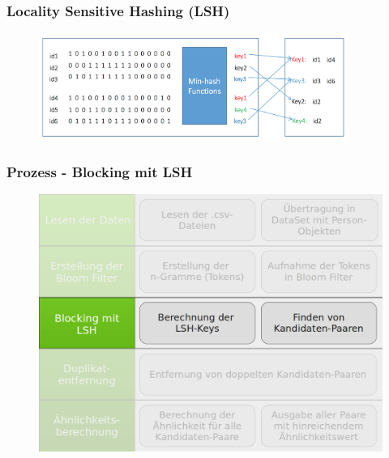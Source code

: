\documentclass{beamer}
\begin{document}
    \begin{frame}
        \frametitle{Locality Sensitive Hashing (LSH)}

            \begin{figure}[H]
                \includegraphics[width=0.9\textwidth]{graphics/lsh_intro.png}
            \end{figure}


    \end{frame}

    \begin{frame}
    		\frametitle{Prozess - Blocking mit LSH}
    		\begin{figure}[H]
    			\includegraphics[width=\textwidth]{graphics/process_3.png}
    		\end{figure}
    \end{frame}
    
\end{document}
